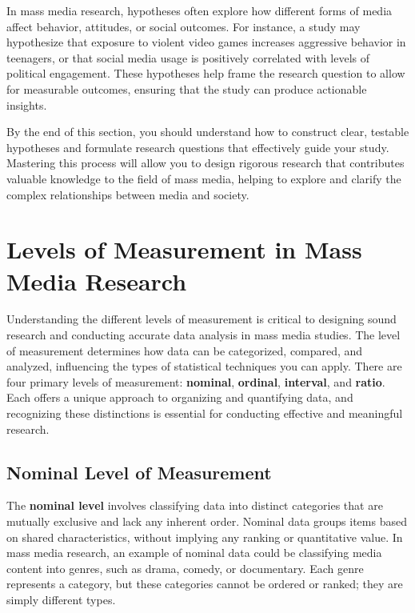 \documentclass[
]{book}
\begin{document}
In mass media research, hypotheses often explore how different forms of media affect behavior, attitudes, or social outcomes. For instance, a study may hypothesize that exposure to violent video games increases aggressive behavior in teenagers, or that social media usage is positively correlated with levels of political engagement. These hypotheses help frame the research question to allow for measurable outcomes, ensuring that the study can produce actionable insights.

By the end of this section, you should understand how to construct clear, testable hypotheses and formulate research questions that effectively guide your study. Mastering this process will allow you to design rigorous research that contributes valuable knowledge to the field of mass media, helping to explore and clarify the complex relationships between media and society.

\section{Levels of Measurement in Mass Media Research}\label{levels-of-measurement-in-mass-media-research}

Understanding the different levels of measurement is critical to designing sound research and conducting accurate data analysis in mass media studies. The level of measurement determines how data can be categorized, compared, and analyzed, influencing the types of statistical techniques you can apply. There are four primary levels of measurement: \textbf{nominal}, \textbf{ordinal}, \textbf{interval}, and \textbf{ratio}. Each offers a unique approach to organizing and quantifying data, and recognizing these distinctions is essential for conducting effective and meaningful research.

\subsection*{Nominal Level of Measurement}\label{nominal-level-of-measurement}

The \textbf{nominal level} involves classifying data into distinct categories that are mutually exclusive and lack any inherent order. Nominal data groups items based on shared characteristics, without implying any ranking or quantitative value. In mass media research, an example of nominal data could be classifying media content into genres, such as drama, comedy, or documentary. Each genre represents a category, but these categories cannot be ordered or ranked; they are simply different types.
\end{document}
